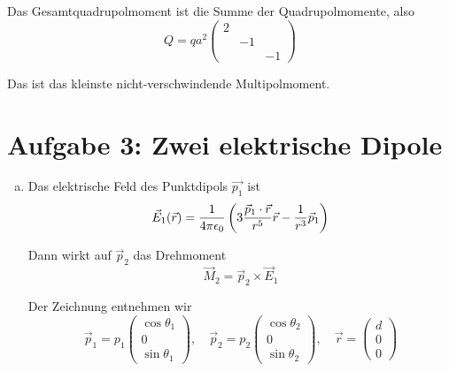\documentclass[a4paper,german,12pt,smallheadings]{scrartcl}
\begin{document}
Das Gesamtquadrupolmoment ist die Summe der Quadrupolmomente, also
\begin{equation}
  Q = qa^2 \begin{pmatrix}
    2 & & \\
      & -1 & \\
      &    & -1
  \end{pmatrix}
\end{equation}

Das ist das kleinste nicht-verschwindende Multipolmoment.

\section*{Aufgabe 3: Zwei elektrische Dipole}
\begin{enumerate}[a)]
  \item
    Das elektrische Feld des Punktdipols $\vec{p_1}$ ist
    \begin{equation}
      \vec{E}_1(\vec{r}) = \frac{1}{4 \pi \epsilon_0} \del{
        3 \frac{\vec{p}_1 \cdot \vec{r}}{r^5} \vec{r} - \frac{1}{r^3} \vec{p}_1
      }
    \end{equation}

    Dann wirkt auf $\vec{p}_2$ das Drehmoment
    \begin{equation}
      \vec{M}_2 = \vec{p}_2 \times \vec{E}_1
    \end{equation}

    Der Zeichnung entnehmen wir
    \begin{equation}
      \vec{p}_1 = p_1 \begin{pmatrix}
        \cos \theta_1 \\
        0 \\
        \sin \theta_1
      \end{pmatrix}, \quad
      \vec{p}_2 = p_2 \begin{pmatrix}
        \cos \theta_2 \\
        0 \\
        \sin \theta_2
      \end{pmatrix}, \quad
      \vec{r} = \begin{pmatrix}
        d \\
        0 \\
        0
      \end{pmatrix}
    \end{equation}


\end{enumerate}
\end{document}
